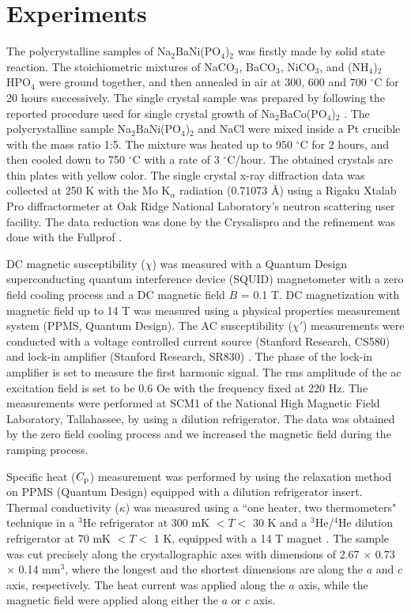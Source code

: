\documentclass[aps,twocolumn,superscriptaddress,showpacs]{revtex4-1}
\begin{document}
\section{Experiments}

The polycrystalline samples of Na$_2$BaNi(PO$_4$)$_2$ was firstly made by solid state reaction. The stoichiometric mixtures of NaCO$_3$, BaCO$_3$, NiCO$_3$, and (NH$_4$)$_2$HPO$_4$ were ground together, and then annealed in air at 300, 600 and 700 $^\circ$C for 20 hours successively. The single crystal sample was prepared by following the reported procedure used for single crystal growth of Na$_2$BaCo(PO$_4$)$_2$ \cite{Zhong14505}. The polycrystalline sample Na$_2$BaNi(PO$_4$)$_2$ and NaCl were mixed inside a Pt crucible with the mass ratio 1:5. The mixture was heated up to 950 $^\circ$C for 2 hours, and then cooled down to 750 $^\circ$C with a rate of 3 $^\circ$C/hour. The obtained crystals are thin plates with yellow color. The single crystal x-ray diffraction data was collected at 250 K with the Mo K$_{\alpha}$ radiation (0.71073 \AA) using a Rigaku Xtalab Pro diffractormeter at Oak Ridge National Laboratory's neutron scattering user facility. The data reduction was done by the Crysalispro and the refinement was done with the Fullprof \cite{Fullprof}.

DC magnetic susceptibility ($\chi$) was measured with a Quantum Design superconducting quantum interference device (SQUID) magnetometer with a zero field cooling process and a DC magnetic field $B$ = 0.1 T. DC magnetization with magnetic field up to 14 T was measured using a physical properties measurement system (PPMS, Quantum Design). The AC susceptibility ($\chi'$) measurements were conducted with a voltage controlled current source (Stanford Research, CS580) and lock-in amplifier (Stanford Research, SR830) \cite{PhysRevB.89.064401}. The phase of the lock-in amplifier is set to measure the first harmonic signal. The rms amplitude of the ac excitation field is set to be 0.6 Oe with the frequency fixed at 220 Hz. The measurements were performed at SCM1 of the National High Magnetic Field Laboratory, Tallahassee, by using a dilution refrigerator. The data was obtained by the zero field cooling process and we increased the magnetic field during the ramping process.

Specific heat ($C\rm_{p}$) measurement was performed by using the relaxation method on PPMS (Quantum Design) equipped with a dilution refrigerator insert. Thermal conductivity ($\kappa$) was measured using a ``one heater, two thermometers" technique in a $^3$He refrigerator at 300 mK $< T <$ 30 K and a $^3$He/$^4$He dilution refrigerator at 70 mK $< T <$ 1 K, equipped with a 14 T magnet \cite{li2020possible, Rao_YMGO, Song_CFO}. The sample was cut precisely along the crystallographic axes with dimensions of 2.67 $\times$ 0.73 $\times$ 0.14 mm$^3$, where the longest and the shortest dimensions are along the $a$ and $c$ axis, respectively. The heat current was applied along the $a$ axis, while the magnetic field were applied along either the $a$ or $c$ axis.
\end{document}

